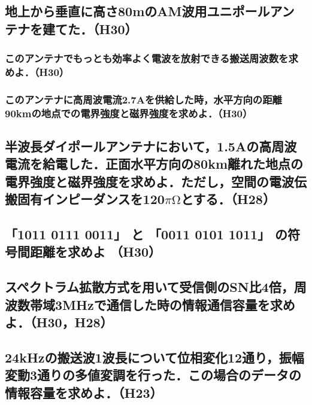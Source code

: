 \newpage
\subsection{地上から垂直に高さ80mのAM波用ユニポールアンテナを建てた．（H30）}
\subsubsection{このアンテナでもっとも効率よく電波を放射できる搬送周波数を求めよ．（H30）}
\vspace{7cm}
\subsubsection{このアンテナに高周波電流2.7Aを供給した時，水平方向の距離90kmの地点での電界強度と磁界強度を求めよ．（H30）}
\vspace{7cm}

\subsection{半波長ダイポールアンテナにおいて，1.5Aの高周波電流を給電した．正面水平方向の80km離れた地点の電界強度と磁界強度を求めよ．ただし，空間の電波伝搬固有インピーダンスを120$\pi\mathrm{\Omega}$とする．（H28）}
\vspace{7cm}

\newpage
\subsection{「1011 0111 0011」 と 「0011 0101 1011」 の符号間距離を求めよ （H30）}
\vspace{7cm}

\subsection{スペクトラム拡散方式を用いて受信側のSN比4倍，周波数帯域3MHzで通信した時の情報通信容量を求めよ．（H30，H28）}
\vspace{7cm}

\subsection{24kHzの搬送波1波長について位相変化12通り，振幅変動3通りの多値変調を行った．この場合のデータの情報容量を求めよ．（H23）}
\vspace{7cm}


